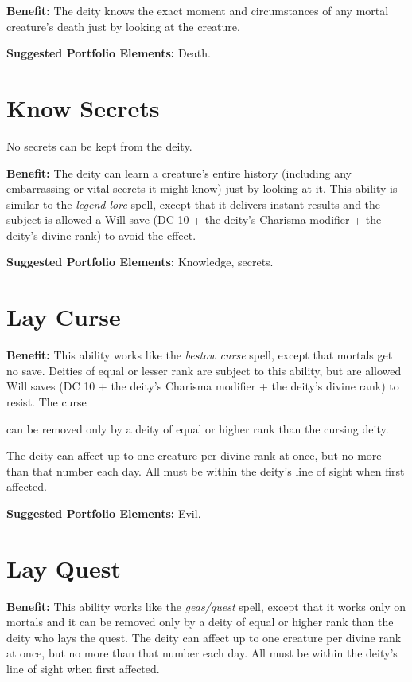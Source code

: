 \documentclass{article}
\begin{document}
\textbf{Benefit:} The deity knows the exact moment and circumstances of any mortal 
creature's death just by looking at the creature.

\textbf{Suggested Portfolio Elements:} Death.

\vspace{12pt}
\section*{Know Secrets}

No secrets can be kept from the deity.

\textbf{Benefit:} The deity can learn a creature's entire history (including any 
embarrassing or vital secrets it might know) just by looking at it. This ability 
is similar to the \textit{legend lore }spell, except that it delivers instant results 
and the subject is allowed a Will save (DC 10 + the deity's Charisma modifier + 
the deity's divine rank) to avoid the effect.

\textbf{Suggested Portfolio Elements:} Knowledge, secrets.

\vspace{12pt}
\section*{Lay Curse}

\textbf{Benefit:} This ability works like the \textit{bestow curse }spell, except 
that mortals get no save. Deities of equal or lesser rank are subject to this ability, 
but are allowed Will saves (DC 10 + the deity's Charisma modifier + the deity's 
divine rank) to resist. The curse

can be removed only by a deity of equal or higher rank than the cursing deity.

The deity can affect up to one creature per divine rank at once, but no more than 
that number each day. All must be within the deity's line of sight when first affected.

\textbf{Suggested Portfolio Elements:} Evil.

\vspace{12pt}
\section*{Lay Quest}

\textbf{Benefit:} This ability works like the \textit{geas/quest }spell, except 
that it works only on mortals and it can be removed only by a deity of equal or 
higher rank than the deity who lays the quest. The deity can affect up to one creature 
per divine rank at once, but no more than that number each day. All must be within 
the deity's line of sight when first affected.
\end{document}
